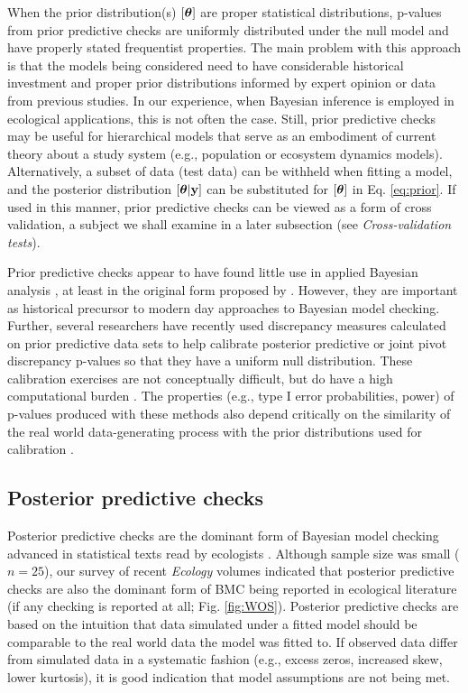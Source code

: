 \documentclass[12pt,english]{article}
\begin{document}
\begin{spacing}{1.9}
When the prior distribution(s) $[\boldsymbol{\theta}]$ are proper statistical
distributions, p-values from prior predictive checks are uniformly
distributed under the null model and have properly stated frequentist
properties.  The main problem with this approach is that the models
being considered need to have considerable historical investment and
proper prior distributions informed by expert opinion or data from
previous studies.  In our experience, when Bayesian inference is
employed in ecological applications, this is not often the case.
Still, prior predictive checks may be useful for hierarchical models
that serve as an embodiment of current theory about a study system
(e.g., population or ecosystem dynamics models).  Alternatively, a
subset of data (test data) can be withheld when fitting a model, and
the posterior distribution $[\boldsymbol{\theta}|{\bf y}]$ can be substituted for
$[\boldsymbol{\theta}]$ in Eq. \ref{eq:prior}.  If used in this manner, prior
predictive checks can be viewed as a form of cross validation, a
subject we shall examine in a later subsection (see
\textit{Cross-validation tests}).

Prior predictive checks appear to have found little use in applied
Bayesian analysis \citep[but see][]{DeyEtAl1998}, at least in the
original form proposed by \citet{Box1980}. However, they are important
as historical precursor to modern day approaches to Bayesian model
checking. Further, several researchers have recently used discrepancy
measures calculated on prior predictive data sets to help calibrate
posterior predictive \citep[e.g.,][]{HjortEtAl2006} or joint pivot
discrepancy \citep{Johnson2007} p-values so that they have a uniform
null distribution.  These calibration exercises are not conceptually
difficult, but do have a high computational burden
\citep{YuanJohnson2012}. The properties (e.g., type I error
probabilities, power) of p-values produced with these methods also
depend critically on the similarity of the real world data-generating
process with the prior distributions used for calibration
\citep{Zhang2014}.

\subsection{Posterior predictive checks}

Posterior predictive checks are the dominant form of Bayesian model
checking advanced in statistical texts read by ecologists
\citep[e.g.,][]{KingEtAl2009,LinkBarker2010,KerySchaub2012,GelmanEtAl2014}. Although
sample size was small ($n=25$), our survey of recent \textit{Ecology}
volumes indicated that posterior predictive checks are also the
dominant form of BMC being reported in ecological
literature (if any checking is reported at all; Fig. \ref{fig:WOS}).
Posterior predictive checks are based on the intuition that data
simulated under a fitted model should be comparable to the real world
data the model was fitted to. If observed data differ from simulated
data in a systematic fashion (e.g., excess zeros, increased skew,
lower kurtosis), it is good indication that model assumptions are not
being met.


\end{spacing}
\end{document}
